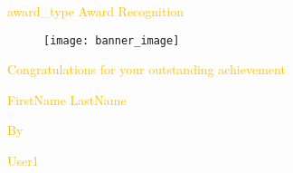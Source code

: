 \documentclass[12pt]{article}
\begin{document}
\begin{landscape}
\pagestyle{empty}
\begin{Center}
{\fontsize{48pt}{57.6pt}\selectfont \textcolor[HTML]{FFC000}{{award_type} Award Recognition}\par}
\end{Center}\par


\begin{figure}[H]
	\begin{Center}
		\texttt{[image: banner\_image]}
	\end{Center}
\end{figure}



\par



\begin{Center}
{\fontsize{16pt}{19.2pt}\selectfont \textcolor[HTML]{FFC000}{Congratulations for your outstanding achievement}\par}
\end{Center}\par


\begin{Center}
{\fontsize{16pt}{19.2pt}\selectfont \textcolor[HTML]{FFC000}{FirstName LastName}\par}
\end{Center}\par


\begin{Center}
{\fontsize{16pt}{19.2pt}\selectfont \textcolor[HTML]{FFC000}{By}\par}
\end{Center}\par


\begin{Center}
{\fontsize{16pt}{19.2pt}\selectfont \textcolor[HTML]{FFC000}{User1}\par}
\end{Center}\par



\end{landscape}
\end{document}
